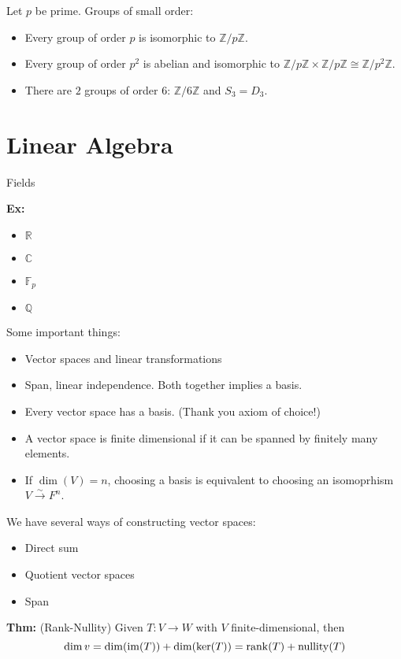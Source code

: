 \documentclass[10pt,letterpaper]{article}
\newcommand{\n}{\hfill\break}
\newcommand{\hangblock}[2]{\par\noindent\settowidth{\hangindent}{\textbf{#1: }}\textbf{#1: }\!\!\!#2}
\newcommand{\thm}[1]{\hangblock{Thm}{#1}}
\newcommand{\ex}[1]{\hangblock{Ex}{#1}}
\newcommand{\integers}{\mathbb{Z}}
\newcommand{\Z}{\integers}
\newcommand{\rationals}{\mathbb{Q}}
\newcommand{\Q}{\rationals}
\newcommand{\reals}{\mathbb{R}}
\newcommand{\R}{\reals}
\newcommand{\complex}{\mathbb{C}}
\newcommand{\C}{\complex}
\newcommand{\im}{\textrm{\textnormal{im}}}
\DeclareMathOperator{\rank}{rank}
\newcommand{\F}{\mathbb{F}}
\DeclareMathOperator{\nullity}{nullity}
\begin{document}
\par\noindent
Let $p$ be prime. Groups of small order:
\begin{itemize}
	\item Every group of order $p$ is isomorphic to $\Z/p\Z$.
	\item Every group of order $p^{2}$ is abelian and isomorphic to $\Z/p\Z\times\Z/p\Z\cong\Z/p^{2}\Z$.
	\item There are $2$ groups of order $6$: $\Z/6\Z$ and $S_{3}=D_{3}$.
\end{itemize}

\section{Linear Algebra}

\par\noindent
Fields\n

\ex{
	\begin{itemize}
		\item $\R$
		\item $\C$
		\item $\F_{p}$
		\item $\Q$
	\end{itemize}
}

\par\noindent
Some important things:
\begin{itemize}
	\item Vector spaces and linear transformations
	\item Span, linear independence. Both together implies a basis.
	\item Every vector space has a basis. (Thank you axiom of choice!)
	\item A vector space is finite dimensional if it can be spanned by finitely many elements.
	\item If $\dim(V)=n$, choosing a basis is equivalent to choosing an isomoprhism $V\overset{\sim}{\to}F^{n}$.
\end{itemize}

\par\noindent
We have several ways of constructing vector spaces:
\begin{itemize}
	\item Direct sum
	\item Quotient vector spaces
	\item Span
\end{itemize}

\thm{
	(Rank-Nullity) Given $T:V\to{}W$ with $V$ finite-dimensional, then
	\[
		\dim{}v=\dim(\im(T))+\dim(\ker(T))=\rank(T)+\nullity(T)
	\]
}
\end{document}
